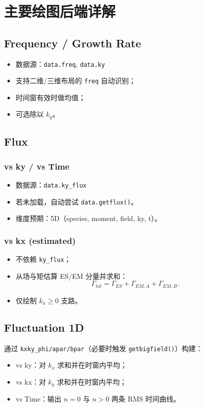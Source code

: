 \documentclass[11pt,a4paper]{ctexart}
\begin{document}
\section{主要绘图后端详解}
\subsection{Frequency / Growth Rate}
\begin{itemize}
  \item 数据源：\texttt{data.freq}, \texttt{data.ky}
  \item 支持二维/三维布局的 \texttt{freq} 自动识别；
  \item 时间窗有效时做均值；
  \item 可选除以 \(k_y\)。
\end{itemize}

\subsection{Flux}
\subsubsection{vs ky / vs Time}
\begin{itemize}
  \item 数据源：\texttt{data.ky\_flux}
  \item 若未加载，自动尝试 \texttt{data.getflux()}。
  \item 维度预期：5D（species, moment, field, ky, t）。
\end{itemize}

\subsubsection{vs kx (estimated)}
\begin{itemize}
  \item 不依赖 \texttt{ky\_flux}；
  \item 从场与矩估算 ES/EM 分量并求和：
  \[
  \Gamma_{tot}=\Gamma_{ES}+\Gamma_{EM,A}+\Gamma_{EM,B}.
  \]
  \item 仅绘制 \(k_x \ge 0\) 支路。
\end{itemize}

\subsection{Fluctuation 1D}
通过 \texttt{kxky\_phi/apar/bpar}（必要时触发 \texttt{getbigfield()}）构建：
\begin{itemize}
  \item vs ky：对 \(k_x\) 求和并在时窗内平均；
  \item vs kx：对 \(k_y\) 求和并在时窗内平均；
  \item vs Time：输出 \(n=0\) 与 \(n>0\) 两条 RMS 时间曲线。
\end{itemize}
\end{document}
